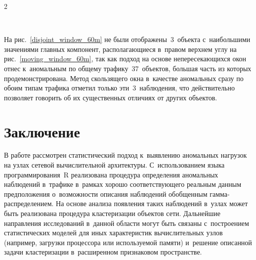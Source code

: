 \begin{multicols}{2}
\begin{figure*} %
\vspace*{-3pt}
\begin{center}
   \mbox{%
\epsfxsize=148.67mm 
}
\end{center}
\vspace*{-12pt}
    \label{moving_window_60m}
\vspace*{-6pt}
\end{figure*}

На рис.~\ref{disjoint_window_60m} не были отображены~3~объекта с~наибольшими 
значениями глав\-ных компонент, рас\-по\-ла\-га\-ющи\-еся в~правом верхнем углу на 
рис.~\ref{moving_window_60m}, так как подход на основе не\-пе\-ре\-се\-ка\-ющих\-ся окон 
отнес к~аномальным по общему трафику~37~объектов, большая часть из которых 
продемонстрирована. Метод скользящего окна в~качестве 
аномальных сразу по обоим типам трафика отметил только 
эти~3~наблюдения, что действительно поз\-во\-ля\-ет говорить об их существенных 
отличиях от других объектов.

\vspace*{-12pt}

\section{Заключение}
\vspace*{-2pt}

В работе рас\-смот\-рен статистический под\-ход к~выявлению аномальных на\-гру\-зок на 
узлах сетевой вы\-чис\-ли\-тель\-ной архитектуры. С~использованием языка 
программирования~R реализована процедура определения аномальных наблюдений 
в~трафике в~рамках хорошо со\-от\-вет\-ст\-ву\-юще\-го реальным данным предположения 
о~воз\-мож\-ности описания наблюдений обоб\-щен\-ным гам\-ма-рас\-пре\-де\-ле\-ни\-ем. На основе 
анализа по\-яв\-ле\-ния таких наблюдений в~узлах может быть реализована процедура 
клас\-те\-ри\-за\-ции объектов сети. Дальнейшие на\-прав\-ле\-ния исследований в~данной 
об\-ласти могут быть связаны с~по\-стро\-ени\-ем ста\-ти\-сти\-че\-ских моделей для иных 
характеристик вы\-чис\-ли\-тель\-ных узлов (например, за\-груз\-ки процессора или 
ис\-поль\-зу\-емой памяти) и~решение описанной задачи клас\-те\-ри\-за\-ции в~расширенном 
при\-зна\-ко\-вом пространстве. 


\end{multicols}
